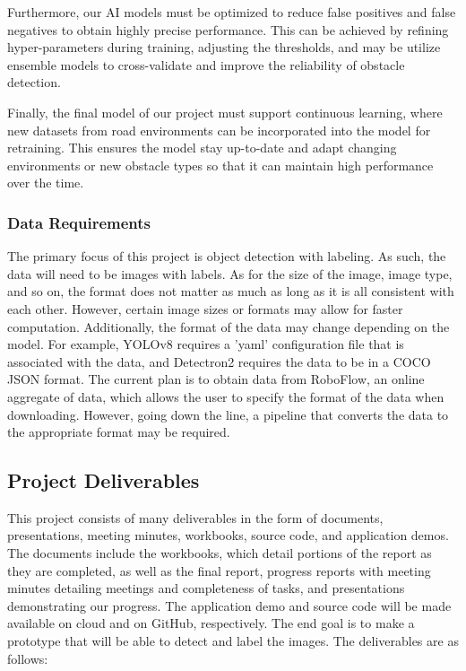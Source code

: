 \documentclass[stu,12pt,floatsintext]{apa7}
\begin{document}
Furthermore, our AI models must be optimized to reduce false positives and false negatives to obtain highly precise performance. This can be achieved by refining hyper-parameters during training, adjusting the thresholds, and may be utilize ensemble models to cross-validate and improve the reliability of obstacle detection. 

Finally, the final model of our project must support continuous learning, where new datasets from road environments can be incorporated into the model for retraining. This ensures the model stay up-to-date and adapt changing environments or new obstacle types so that it can maintain high performance over the time. 

\subsubsection{Data Requirements}
The primary focus of this project is object detection with labeling. As such, the data will need to be images with labels. As for the size of the image, image type, and so on, the format does not matter as much as long as it is all consistent with each other. However, certain image sizes or formats may allow for faster computation. Additionally, the format of the data may change depending on the model. For example, YOLOv8 requires a 'yaml' configuration file that is associated with the data, and Detectron2 requires the data to be in a COCO JSON format. The current plan is to obtain data from RoboFlow, an online aggregate of data, which allows the user to specify the format of the data when downloading. However, going down the line, a pipeline that converts the data to the appropriate format may be required.

\subsection{Project Deliverables}
This project consists of many deliverables in the form of documents, presentations, meeting minutes, workbooks, source code, and application demos. The documents include the workbooks, which detail portions of the report as they are completed, as well as the final report, progress reports with meeting minutes detailing meetings and completeness of tasks, and presentations demonstrating our progress. The application demo and source code will be made available on cloud and on GitHub, respectively. The end goal is to make a prototype that will be able to detect and label the images.
The deliverables are as follows:
\end{document}
